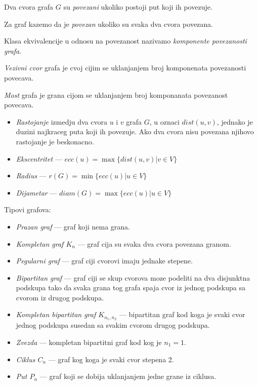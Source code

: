 \documentclass[12p, a4paper]{article}
\begin{document}
\begin{multicols}{2}
    Dva cvora grafa $G$ su \emph{povezani} ukoliko postoji put koji ih 
    povezuje.

    Za graf kazemo da je \emph{povezan} ukoliko su svaka dva cvora povezana.

    Klasa ekvivalencije u odnosu na povezanost nazivamo 
    \emph{komponente povezanosti grafa}.

    \emph{Vezivni cvor} grafa je cvoj cijim se uklanjanjem broj komponenata
    povezanosti povecava.

    \emph{Most} grafa je grana cijom se uklanjanjem broj komponanata 
    povezanost povecava.

    \begin{itemize}
        \itemsep0em
        \item \emph{Rastojanje} izmedju dva cvora $u$ i $v$ grafa $G$,
              u oznaci $dist(u, v)$, jednako je duzini najkraceg puta koji
              ih povezuje. Ako dva cvora nisu povezana njihovo rastojanje je
              beskonacno.
        \item \emph{Ekscentritet} --- $ecc(u) = \max \{dist(u, v)| v \in V\}$
        \item \emph{Radius} --- $r(G) = \min \{ ecc(u) | u \in V\}$
        \item \emph{Dijametar} --- $diam(G) = \max \{ecc(u) | u \in V\}$
    \end{itemize}

    Tipovi grafova:
    \begin{itemize}
        \itemsep0em
        \item \emph{Prazan graf} --- graf koji nema grana.
        \item \emph{Kompletan graf $K_n$} --- graf cija su svaka dva 
              cvora povezana granom.
        \item \emph{Pegularni graf} --- graf ciji cvorovi imaju jednake 
              stepene.
        \item \emph{Bipartitan graf} --- graf ciji se skup cvorova moze
              podeliti na dva disjunktna podskupa tako da svaka grana tog grafa
              spaja cvor iz jednog podskupa sa cvorom iz drugog podskupa.
        \item \emph{Kompletan bipartitan graf $K_{n_1, n_2}$} --- 
              bipartitan graf kod koga je svaki cvor jednog podskupa susedan 
              sa svakim cvorom drugog podskupa.
        \item \emph{Zvezda} --- kompletan bipartitni graf kod kog je $n_1 = 1$.
        \item \emph{Ciklus $C_n$} --- graf kog koga je svaki cvor stepena 2.
        \item \emph{Put $P_n$} --- graf koji se dobija uklanjanjem jedne grane
              iz ciklusa.
    \end{itemize}


\end{multicols}
\end{document}
